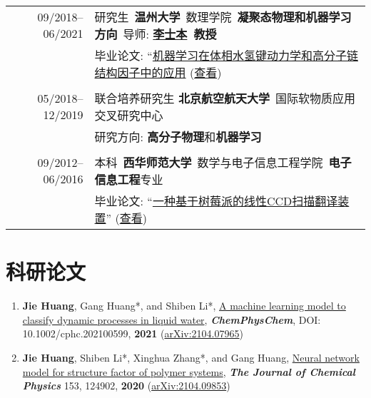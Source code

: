 \documentclass[a4paper,10pt]{article} %
\begin{document}
\begin{tabular}{r|l}	

09/2018--06/2021 				    &研究生\ \textbf{温州大学}\ 数理学院\  \textbf{凝聚态物理和机器学习方向}\ 导师: \textbf{\href{http://slxy.wzu.edu.cn/lsb.pdf}{李士本}\ 教授}\\
                                    & 毕业论文: “\href{https://nbviewer.jupyter.org/github/HuangJiaLian/DataBase0/blob/master/uPic/2021_07_24_12_HuangJieBiYeDaBian.pdf}{机器学习在体相水氢键动力学和高分子链结构因子中的应用} (\href{http://nbviewer.jupyter.org/github/HuangJiaLian/DataBase0/blob/master/uPic/2021_07_24_01_ms_thesis.pdf}{查看})\\

\multicolumn{2}{c}{} \\	%

05/2018--12/2019            & 联合培养研究生 \textbf{北京航空航天大学}\ 国际软物质应用交叉研究中心  \\	
& 研究方向: \textbf{高分子物理}和\textbf{机器学习}\\

\multicolumn{2}{c}{} \\	%

09/2012--06/2016                    & 本科\ \textbf{西华师范大学}\ 数学与电子信息工程学院\ \textbf{电子信息工程}专业 \\
					 & 毕业论文: “\href{https://nbviewer.jupyter.org/github/HuangJiaLian/DataBase0/blob/master/uPic/2021_07_24_13_CCD_translation_device.pdf}{一种基于树莓派的线性CCD扫描翻译装置}” (\href{https://nbviewer.jupyter.org/github/HuangJiaLian/DataBase0/blob/master/uPic/CCD_Translation_Machine.pdf}{查看})\
\end{tabular}

\section{科研论文}  
\begin{small}
	\begin{enumerate}
		\item \textbf{Jie Huang}, Gang Huang*, and Shiben Li*, \href{https://chemistry-europe.onlinelibrary.wiley.com/doi/abs/10.1002/cphc.202100599}{A machine learning model to classify dynamic processes in liquid water},   \textbf{\emph{ChemPhysChem}}, DOI: 10.1002/cphc.202100599,\textbf{ 2021} (\href{https://arxiv.org/abs/2104.07965}{arXiv:2104.07965})
		
		\item \textbf{Jie Huang}, Shiben Li*, Xinghua Zhang*, and Gang Huang, \href{https://aip.scitation.org/doi/10.1063/5.0022464}{Neural network model for structure factor of polymer systems},  \textbf{\emph{The Journal of Chemical Physics}} 153, 124902, \textbf{2020} (\href{https://arxiv.org/abs/2104.09853}{arXiv:2104.09853})
	\end{enumerate}
\end{small}
\end{document}
